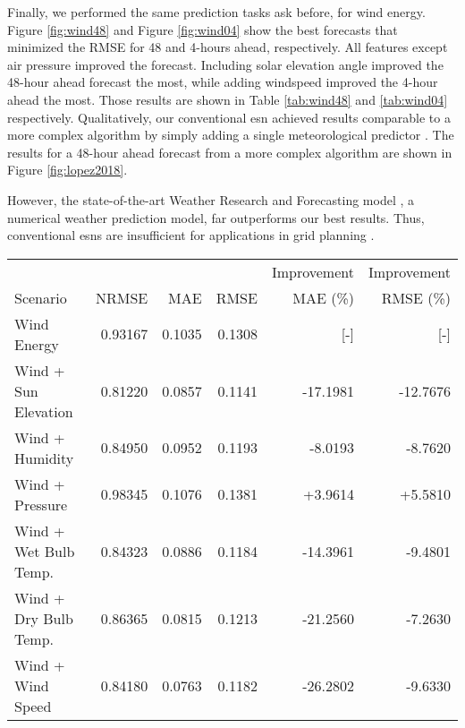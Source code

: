 Finally, we performed the same prediction tasks ask before, for wind energy.
Figure \ref{fig:wind48} and Figure \ref{fig:wind04} show the best forecasts
that minimized the RMSE for
48 and 4-hours ahead, respectively. All features except air pressure improved
the forecast. Including solar elevation angle improved the 48-hour ahead
forecast the most, while adding windspeed improved the 4-hour ahead the most.
Those results are shown in Table \ref{tab:wind48} and \ref{tab:wind04}
respectively. Qualitatively, our conventional \gls{esn} achieved results
comparable to a more complex algorithm by simply adding a single meteorological
predictor \cite{lopez_wind_2018}. The results for a 48-hour ahead forecast from
a more complex algorithm are shown in Figure \ref{fig:lopez2018}.

However, the state-of-the-art Weather Research and Forecasting model
\cite{powers_weather_2017}, a numerical weather prediction model, far
outperforms our best results. Thus, conventional \glspl{esn} are insufficient
for applications in grid planning \cite{wang_quantifying_2016}.

\begin{figure*}[h]
  \centering
  
  \caption{The optimized 48-hour ahead wind energy prediction that minimized
  the RMSE. The inputs for this forecast were wind energy and solar elevation
  angle. \textit{Hyperparameters}: Reservoir Size:1000, Sparsity: 0.1, Spectral
  Radius: 0.9, Noise: 0.0001, Training Length: 19100, Prediction Window: 48,
  Random state: 85}
  \label{fig:wind48}
\end{figure*}
  \begin{table*}[h]
    \centering
    \caption{Tabulated error for 48-hour ahead wind forecasts with various coupled quantities. Improvement indicates the percentage improvement over the base case of forecasting wind energy alone.}
    \label{tab:wind48}
    \begin{tabular}{l|r|r|r|r|r}
      & & & & Improvement & Improvement \\
      Scenario &NRMSE & MAE & RMSE & MAE (\%) & RMSE (\%)\\
      \hline
      Wind Energy & 0.93167 & 0.1035 & 0.1308 & [-] & [-] \\
      Wind + Sun Elevation & 0.81220 & 0.0857 & 0.1141 & -17.1981 & -12.7676 \\
      Wind + Humidity & 0.84950 & 0.0952 & 0.1193 & -8.0193 & -8.7620 \\
      Wind + Pressure & 0.98345 & 0.1076 & 0.1381 & +3.9614 & +5.5810 \\
      Wind + Wet Bulb Temp. & 0.84323 & 0.0886 & 0.1184 & -14.3961 & -9.4801 \\
      Wind + Dry Bulb Temp. & 0.86365 & 0.0815 & 0.1213 & -21.2560 & -7.2630 \\
      Wind + Wind Speed & 0.84180 & 0.0763 & 0.1182 & -26.2802 & -9.6330 \\
    \end{tabular}
  \end{table*}
